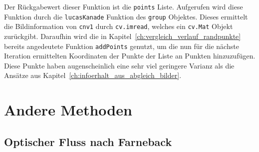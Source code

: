 Der Rückgabewert dieser Funktion ist die \lstinline{points} Liste.
Aufgerufen wird diese Funktion durch die \lstinline{lucasKanade} Funktion des \lstinline{group} Objektes.
Dieses ermittelt die Bildinformation von \lstinline{cnv1} durch \lstinline{cv.imread}, welches ein \lstinline{cv.Mat} Objekt zurückgibt.
Daraufhin wird die in Kapitel~\ref{ch:vergleich_verlauf_randpunkte} bereits angedeutete Funktion \lstinline{addPoints} genutzt, um die nun für die nächste Iteration ermittelten Koordinaten der Punkte der Liste an Punkten hinzuzufügen.
Diese Punkte haben augenscheinlich eine sehr viel geringere Varianz als die Ansätze aus Kapitel~\ref{ch:infoerhalt_aus_abgleich_bilder}.

\section{Andere Methoden}

\subsection{Optischer Fluss nach Farneback}

